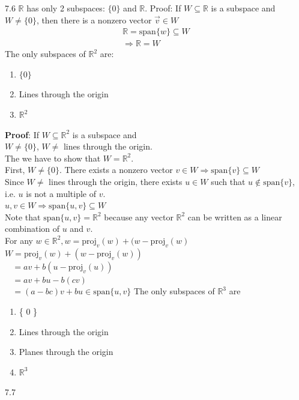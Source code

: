 \documentclass[]{article}
\begin{document}
		\large{7.6}
		\normalsize
		$\mathbb{R}$ has only 2 subspaces: $\{0\}$ and $\mathbb{R}$.
		Proof: If $W\subseteq\mathbb{R}$ is a subspace and $W\ne\{0\}$, then there is a nonzero vector $\vec{v}\in W$
		\begin{align*}
			\mathbb{R}=\text{span}\{w\}\subseteq W\\
			\Rightarrow\mathbb{R}=W
		\end{align*}
		The only subspaces of $\mathbb{R}^2$ are:
		\begin{enumerate}
			\item $\{ 0 \}$
			\item Lines through the origin
			\item $\mathbb{R}^2$
		\end{enumerate}
		{\bf Proof}: If $W\subseteq\mathbb{R}^2$ is a subspace and\\
		$W\ne\{0\}$, $W\ne$ lines through the origin.\\
		The we have to show that $W=\mathbb{R}^2$.\\
		\vspace{3mm}
		First, $W\ne\{0\}$. There exists a nonzero vector $v\in W\Rightarrow\text{span}\{v\}\subseteq W$\\
		Since $W\ne$ lines through the origin, there exists $u\in W$ such that $u\notin\text{span}\{v\}$, i.e. $u$ is not a multiple of $v$.\\
		\vspace{3mm}
		\noindent$u,v\in W\Rightarrow\text{span}\{u,v\}\subseteq W$\\
		Note that $\text{span}\{u,v\}=\mathbb{R}^2$ because any vector $\mathbb{R}^2$ can be written as a linear combination of $u$ and $v$.\\
		For any $w\in\mathbb{R}^2, w=\text{proj}_v(w)+(w-\text{proj}_v(w)$\\
		$W=\text{proj}_v(w)+(w-\text{proj}_v(w))$\\
		$~~~~=av+b(u-\text{proj}_v(u))$\\
		$~~~~=av+bu-b(cv)$\\
		$~~~~=(a-bc)v+bu\in\text{span}\{ u,v \}$
		The only subspaces of $\mathbb{R}^3$ are
		\begin{enumerate}
			\item \{ 0 \}
			\item Lines through the origin
			\item Planes through the origin
			\item $\mathbb{R}^3$
		\end{enumerate}
		\large{7.7}\\
\end{document}
